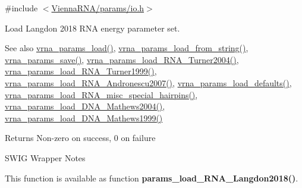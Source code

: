{\ttfamily \#include $<$\mbox{\hyperlink{io_8h}{Vienna\+R\+N\+A/params/io.\+h}}$>$}



Load Langdon 2018 R\+NA energy parameter set. 

\begin{DoxySeeAlso}{See also}
\mbox{\hyperlink{group__energy__parameters__rw_gabb0583595c67094986ef90cb4f1c7555}{vrna\+\_\+params\+\_\+load()}}, \mbox{\hyperlink{group__energy__parameters__rw_gabcd9cc7040a6b633b56b1cbd6a14d68e}{vrna\+\_\+params\+\_\+load\+\_\+from\+\_\+string()}}, \mbox{\hyperlink{group__energy__parameters__rw_ga0de3731b3e4017c52bd678549f6c4ae5}{vrna\+\_\+params\+\_\+save()}}, \mbox{\hyperlink{group__energy__parameters__rw_ga7327fe66ef60c33ba80a87c04db0ee83}{vrna\+\_\+params\+\_\+load\+\_\+\+R\+N\+A\+\_\+\+Turner2004()}}, \mbox{\hyperlink{group__energy__parameters__rw_ga804393b6dfe06a2c6cae89219dffabb1}{vrna\+\_\+params\+\_\+load\+\_\+\+R\+N\+A\+\_\+\+Turner1999()}}, \mbox{\hyperlink{group__energy__parameters__rw_ga511a1c17c0fd10a1fbb0936674712ff8}{vrna\+\_\+params\+\_\+load\+\_\+\+R\+N\+A\+\_\+\+Andronescu2007()}}, \mbox{\hyperlink{group__energy__parameters__rw_ga413bc688695c9a707dbcc678412d6792}{vrna\+\_\+params\+\_\+load\+\_\+defaults()}}, \mbox{\hyperlink{group__energy__parameters__rw_ga00e07504d66dc24aca7befb4bdaa0db1}{vrna\+\_\+params\+\_\+load\+\_\+\+R\+N\+A\+\_\+misc\+\_\+special\+\_\+hairpins()}}, \mbox{\hyperlink{group__energy__parameters__rw_gafa45b5734355baa634ca0a2e2857563e}{vrna\+\_\+params\+\_\+load\+\_\+\+D\+N\+A\+\_\+\+Mathews2004()}}, \mbox{\hyperlink{group__energy__parameters__rw_ga4d897130a700f86b7d4035a95f25615a}{vrna\+\_\+params\+\_\+load\+\_\+\+D\+N\+A\+\_\+\+Mathews1999()}}
\end{DoxySeeAlso}
\begin{DoxyReturn}{Returns}
Non-\/zero on success, 0 on failure
\end{DoxyReturn}
\begin{DoxyRefDesc}{S\+W\+I\+G Wrapper Notes}
\item[\mbox{\hyperlink{wrappers__wrappers000105}{S\+W\+I\+G Wrapper Notes}}]This function is available as function {\bfseries{params\+\_\+load\+\_\+\+R\+N\+A\+\_\+\+Langdon2018()}}. \end{DoxyRefDesc}
\mbox{\label{group__energy__parameters__rw_ga00e07504d66dc24aca7befb4bdaa0db1}} 
